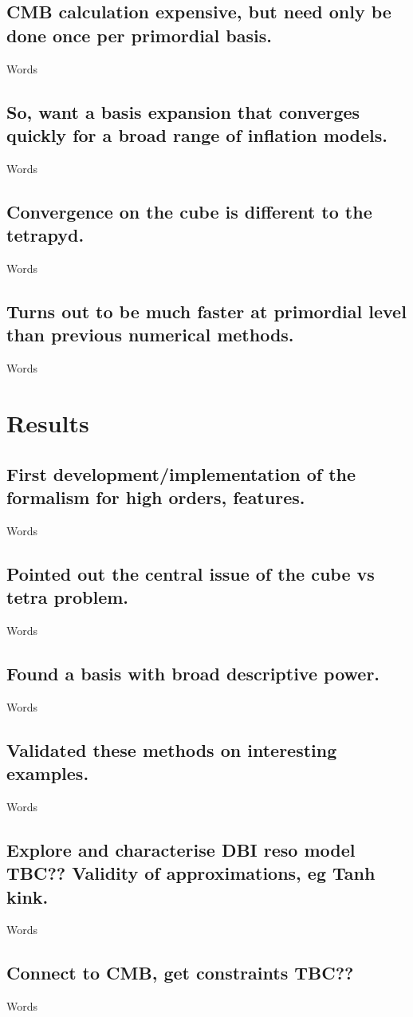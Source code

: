     \subsection{CMB calculation expensive, but need only be done once per primordial basis.}
    Words
    \subsection{So, want a basis expansion that converges quickly for a broad range of inflation models.}
    Words
    \subsection{Convergence on the cube is different to the tetrapyd.}
    Words
    \subsection{Turns out to be much faster at primordial level than previous numerical methods.}
    Words
\newpage
\section{Results}
    \subsection{First development/implementation of the formalism for high orders, features.}
    Words
    \subsection{Pointed out the central issue of the cube vs tetra problem.}
    Words
    \subsection{Found a basis with broad descriptive power.}
    Words
    \subsection{Validated these methods on interesting examples.}
    Words
    \subsection{Explore and characterise DBI reso model TBC?? Validity of approximations, eg Tanh kink.}
    Words
    \subsection{Connect to CMB, get constraints TBC??}
    Words

